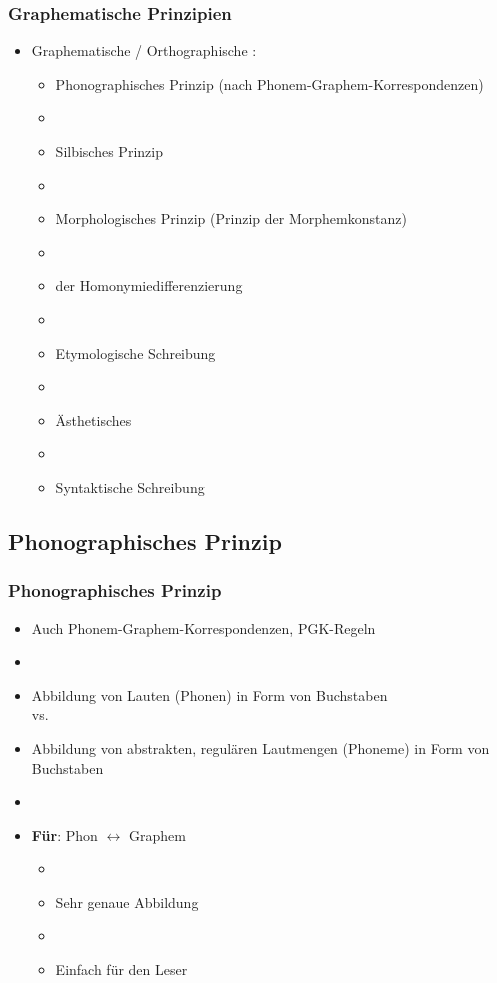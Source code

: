 \begin{frame}
\frametitle{Graphematische Prinzipien}

\begin{itemize}
	\item Graphematische / Orthographische :
	
	\begin{itemize}
		\item Phonographisches Prinzip (nach Phonem-Graphem-Korrespondenzen)
		\item[]
		\item Silbisches Prinzip
		\item[]
		\item Morphologisches Prinzip (Prinzip der Morphemkonstanz)
		\item[]
		\item {} der Homonymiedifferenzierung
		\item[]
		\item Etymologische Schreibung
		\item[]
		\item Ästhetisches 
		\item[]
		\item Syntaktische Schreibung
	\end{itemize}
\end{itemize}


\end{frame}


\subsection{Phonographisches Prinzip}


\begin{frame}
\frametitle{Phonographisches Prinzip}

\begin{itemize}
	\item Auch Phonem-Graphem-Korrespondenzen, PGK-Regeln
	\item[]
\pause	
	\item Abbildung von Lauten (Phonen) in Form von Buchstaben \\ vs.
	\item Abbildung von abstrakten, regulären Lautmengen (Phoneme) in
Form von Buchstaben
	\item[]
	\item \textbf{Für}: Phon $\leftrightarrow$ Graphem
	
	\begin{itemize}
		\item[]
		\item Sehr genaue Abbildung
		\item[]
		\item Einfach für den Leser
	\end{itemize}
\end{itemize}


\end{frame}




